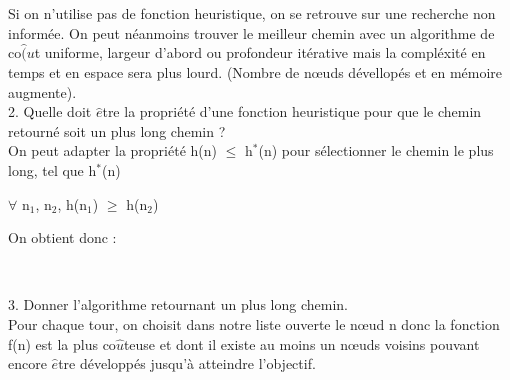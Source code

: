 \documentclass[12pt,a4paper, france]{article}
\newcommand\tab[1][1cm]{\hspace*{#1}}
\begin{document}
Si on n\textquoteright utilise pas de fonction heuristique, on se retrouve sur une recherche non inform\'ee. On peut n\'eanmoins trouver le meilleur chemin avec un algorithme de co${\hat(u}$t uniforme, largeur d\textquoteright abord ou profondeur it\'erative mais la compl\'exit\'e en temps et en espace sera plus lourd. (Nombre de nœuds d\'evellop\'es et en m\'emoire augmente). \\

\tab 2. Quelle doit ${\hat{e}}$tre la propri\'et\'e d\textquoteright une fonction heuristique pour que le chemin retourn\'e soit un plus long chemin ? \\

On peut adapter la propri\'et\'e h(n) ${\leq}$ h${^*}$(n) pour s\'electionner le chemin le plus long, tel que h${^*}$(n) 
\begin{center}
    ${\forall}$ n${_1}$, n${_2}$, h(n${_1}$) ${\geq}$ h(n${_2}$) \\
\end{center}

On obtient donc : \\

\begin{center}
 \\ [5mm]
\end{center}

\tab 3. Donner l\textquoteright algorithme retournant un plus long chemin. \\

Pour chaque tour, on choisit dans notre liste ouverte le nœud n donc la fonction f(n) est la plus co${\hat{u}}$teuse et dont il existe au moins un nœuds voisins pouvant encore ${\hat{e}}$tre d\'evelopp\'es jusqu\textquoteright \`a atteindre l\textquoteright objectif. \\
\end{document}
